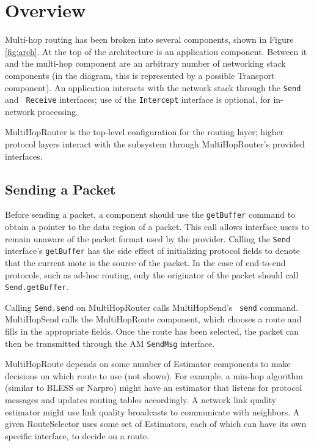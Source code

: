 \documentclass[10pt]{article}
\begin{document}
\section*{Overview}

Multi-hop routing has been broken into several components, shown in
Figure \ref{fig:arch}. At the top of the architecture is an
application component. Between it and the multi-hop component are an
arbitrary number of networking stack components (in the diagram, this
is represented by a possible Transport component). An application
interacts with the network stack through the {\tt Send} and {\tt
Receive} interfaces; use of the {\tt Intercept} interface is optional,
for in-network processing.

MultiHopRouter is the top-level configuration for the routing layer;
higher protocol layers interact with the subsystem through
MultiHopRouter's provided interfaces.

\subsection*{Sending a Packet}

Before sending a packet, a component should use the {\tt getBuffer}
command to obtain a pointer to the data region of a packet. This call
allows interface users to remain unaware of the packet format used by
the provider. Calling the {\tt Send} interface's {\tt getBuffer} has
the side effect of initializing protocol fields to denote that the
current mote is the source of the packet. In the case of end-to-end
protocols, such as ad-hoc routing, only the originator of the packet
should call {\tt Send.getBuffer}.

Calling {\tt Send.send} on MultiHopRouter calls MultiHopSend's {\tt
send} command. MultiHopSend calls the MultiHopRoute component, which
chooses a route and fills in the appropriate fields. Once the route
has been selected, the packet can then be transmitted through the AM
{\tt SendMsg} interface.

MultiHopRoute depends on some number of Estimator components to make
decisions on which route to use (not shown). For example, a min-hop
algorithm (similar to BLESS or Narpro) might have an estimator that
listens for protocol messages and updates routing tables
accordingly. A network link quality estimator might use link quality
broadcasts to communicate with neighbors. A given RouteSelector uses
some set of Estimators, each of which can have its own specific
interface, to decide on a route.
\end{document}
